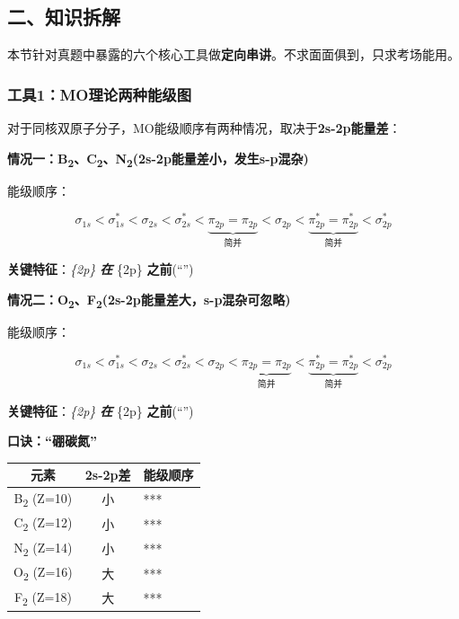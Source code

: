 \subsection{二、知识拆解}\label{ux4e8cux77e5ux8bc6ux62c6ux89e3-1}

本节针对真题中暴露的六个核心工具做\textbf{定向串讲}。不求面面俱到，只求考场能用。

\subsubsection{工具1：MO理论两种能级图}\label{ux5de5ux51771moux7406ux8bbaux4e24ux79cdux80fdux7ea7ux56fe}

对于同核双原子分子，MO能级顺序有两种情况，取决于\textbf{2s-2p能量差}：

\textbf{情况一：B\textsubscript{2}、C\textsubscript{2}、N\textsubscript{2}(2s-2p能量差小，发生s-p混杂)}

能级顺序：

\[\sigma_{1s} < \sigma^*_{1s} < \sigma_{2s} < \sigma^*_{2s} < \underbrace{\pi_{2p} = \pi_{2p}}_{简并} < \sigma_{2p} < \underbrace{\pi^*_{2p} = \pi^*_{2p}}_{简并} < \sigma^*_{2p}\]

\textbf{关键特征}：\派\emph{\{2p\} \textbf{在} }\{2p\} \textbf{之前}(``'')

\textbf{情况二：O\textsubscript{2}、F\textsubscript{2}(2s-2p能量差大，s-p混杂可忽略)}

能级顺序：

\[\sigma_{1s} < \sigma^*_{1s} < \sigma_{2s} < \sigma^*_{2s} < \sigma_{2p} < \underbrace{\pi_{2p} = \pi_{2p}}_{简并} < \underbrace{\pi^*_{2p} = \pi^*_{2p}}_{简并} < \sigma^*_{2p}\]

\textbf{关键特征}：\emph{\{2p\} \textbf{在} \派}\{2p\} \textbf{之前}(``\派'')

\textbf{口诀：``硼碳氮''}

{\def\LTcaptype{none} %
\begin{longtable}[]{@{}ccl@{}}
\toprule\noalign{}
元素 & 2s-2p差 & 能级顺序 \\
\midrule\noalign{}
\endhead
\bottomrule\noalign{}
\endlastfoot
B\textsubscript{2} (Z=10) & 小 & *** \\
C\textsubscript{2} (Z=12) & 小 & *** \\
N\textsubscript{2} (Z=14) & 小 & *** \\
O\textsubscript{2} (Z=16) & 大 & *** \\
F\textsubscript{2} (Z=18) & 大 & *** \\
\end{longtable}
}

